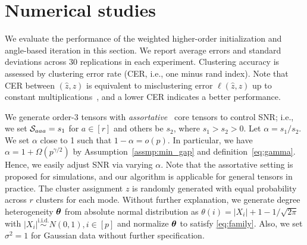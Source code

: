 \documentclass[lettersize,onecolumn,journal]{IEEEtran}
\theoremstyle{definition}
\theoremstyle{definition}
\newcommand{\of}[1]{\left(#1\right)}
\def\fixme#1#2{\textbf{\color{red}[FIXME (#1): #2]}}
\begin{document}







\section{Numerical studies}\label{sec:simulation}

 We evaluate the performance of the weighted higher-order initialization and angle-based iteration in this section. We report average errors and standard deviations across 30 replications in each experiment. Clustering accuracy is assessed by clustering error rate (CER, i.e., one minus rand index). Note that CER between $(\hat z, z)$ is equivalent to misclustering error $\ell(\hat z, z)$ up to constant multiplications~\citep{meilua2012local}, and a lower CER indicates a better performance.

We generate order-3 tensors with \emph{assortative}~\citep{gao2018community} core tensors to control SNR; i.e., we set $\mathcal{S}_{aaa} = s_1$ for $a \in [r]$ and others be $s_2$, where $s_1 > s_2 > 0$. Let $\alpha = s_1/s_2$. We set $\alpha$ close to 1 such that $1-\alpha=o(p)$. In particular, we have $\alpha = 1 + \Omega(p^{\gamma/2})$ %
  by Assumption~\ref{assmp:min_gap} and definition~\eqref{eq:gamma}.
  Hence, we easily adjust SNR via varying $\alpha$. 
 Note that the assortative setting is proposed for simulations, and our algorithm is applicable for general tensors in practice. The cluster assignment $z$ is randomly generated with equal probability across  $r$ clusters for each mode. Without further explanation, we generate degree heterogeneity $\boldsymbol{\theta}$ from absolute normal distribution as $\theta(i) = |X_i| + 1 - 1/\sqrt{2\pi}$ with $|X_i| \stackrel{\text{i.i.d.}}\sim N(0,1), i \in [p]$ and normalize $\boldsymbol{\theta}$ to satisfy \eqref{eq:family}. Also, we set $\sigma^2 = 1$ for Gaussian data without further specification. 
\end{document}
